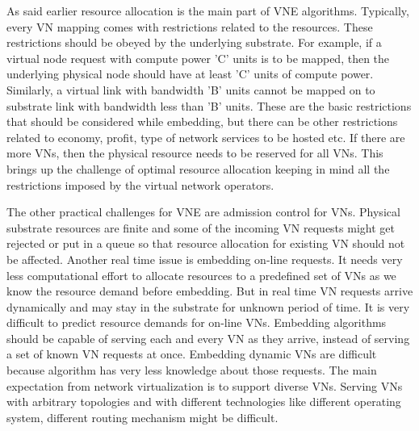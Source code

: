 \documentclass[article,dr=phil,type=msc ,colorback,accentcolor=tud4b]{tudthesis}
\begin{document}
As said earlier resource allocation is the main part of VNE algorithms. Typically, every VN mapping comes with restrictions related to the resources. These restrictions should be obeyed by the underlying substrate. For example, if a virtual node request with compute power 'C' units is to be mapped, then the underlying physical node should have at least 'C' units of compute power. Similarly, a virtual link with bandwidth 'B' units cannot be mapped on to substrate link with bandwidth less than 'B' units. These are the basic restrictions that should be considered while embedding, but there can be other restrictions related to economy, profit, type of network services to be hosted etc. If there are more VNs, then the physical resource needs to be reserved for all VNs. This brings up the challenge of optimal resource allocation keeping in mind all the restrictions imposed by the virtual network operators.\newline

The other practical challenges for VNE are admission control for VNs. Physical substrate resources are finite and some of the incoming VN requests might get rejected or put in a queue so that resource allocation for existing VN should not be affected. Another real time issue is embedding on-line requests. It needs very less computational effort to allocate resources to a predefined set of VNs as we know the resource demand before embedding. But in real time VN requests arrive dynamically and may stay in the substrate for unknown period of time. It is very difficult to predict resource demands for on-line VNs. Embedding algorithms should be capable of serving each and every VN as they arrive, instead of serving a set of known VN requests at once. Embedding dynamic VNs are difficult because algorithm has very less knowledge about those requests. The main expectation from network virtualization is to support diverse VNs. Serving VNs with arbitrary topologies and with different technologies like different operating system, different routing mechanism might be difficult.\newline
\end{document}
